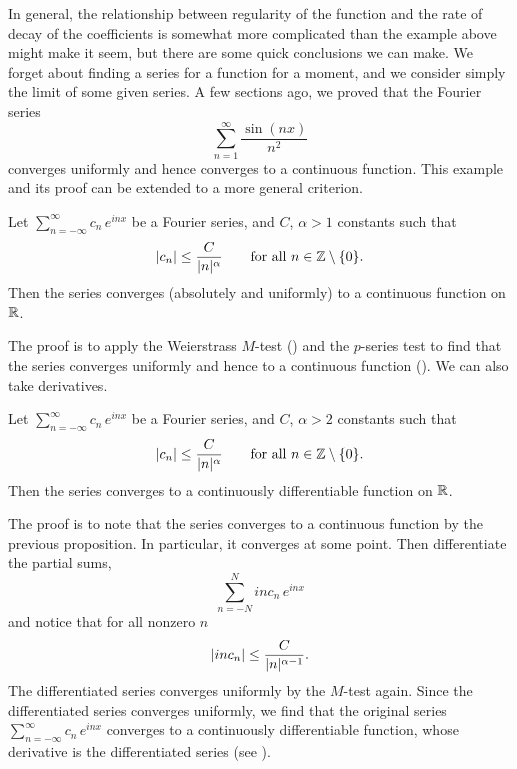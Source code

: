 In general, the relationship between regularity of the function and
the rate of decay of the coefficients is somewhat more complicated
than the example above
might make it seem, but there are some quick conclusions we can make.
We forget about finding a series for a function for a moment,
and we consider simply the limit of some given series.
A few sections ago, we proved that the Fourier series 
\begin{equation*}
\sum_{n=1}^\infty \frac{\sin(nx)}{n^2}
\end{equation*}
converges uniformly and hence converges to a continuous function.  This 
example and its proof can be extended to a more general criterion.

\begin{prop}
Let $\sum_{n=-\infty}^\infty c_n\, e^{inx}$ be a Fourier series,
and $C$, $\alpha > 1$ constants such that
\begin{equation*}
\sabs{c_n} \leq \frac{C}{\sabs{n}^\alpha}
\qquad \text{for all } n \in \Z \setminus \{ 0 \}.
\avoidbreak
\end{equation*}
Then the series converges (absolutely and uniformly) to a continuous function on ${\mathbb{R}}$.
\end{prop}

The proof is to apply the Weierstrass $M$-test () and
the $p$-series test to find that the series converges uniformly and hence
to a continuous function ().
We can also take derivatives.

\begin{prop}
Let $\sum_{n=-\infty}^\infty c_n\, e^{inx}$ be a Fourier series,
and $C$, $\alpha > 2$ constants such that
\begin{equation*}
\sabs{c_n} \leq \frac{C}{\sabs{n}^\alpha}
\qquad \text{for all } n \in \Z \setminus \{ 0 \}.
\avoidbreak
\end{equation*}
Then the series converges to a continuously differentiable function on ${\mathbb{R}}$.
\end{prop}

The proof is to note that the series converges to a continuous
function by the previous proposition.
In particular, it converges at some point.
Then differentiate the partial sums,
\begin{equation*}
\sum_{n=-N}^{N}
i n c_n \,e^{inx}
\end{equation*}
and notice that for all nonzero $n$
\begin{equation*}
\lvert {i n c_n} \rvert \leq \frac{C}{\lvert {n} \rvert^{\alpha-1}} .
\end{equation*}
The differentiated series converges uniformly by the $M$-test again.  Since
the differentiated series
converges uniformly, we find that the original series
$\sum_{n=-\infty}^\infty c_n\,e^{inx}$
converges 
to a continuously differentiable function, whose derivative is
the differentiated series (see ).

